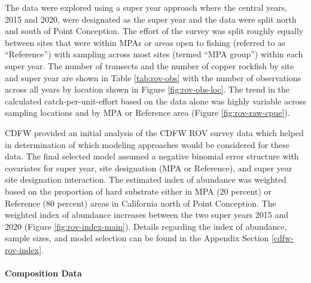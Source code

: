 \documentclass[11pt,
  english,
  letterpaper,
]{article}
\begin{document}
The data were explored using a super year approach where the central years, 2015 and 2020, were designated as the super year and the data were split north and south of Point Conception. The effort of the survey was split roughly equally between sites that were within MPAs or areas open to fishing (referred to as ``Reference'') with sampling across most sites (termed ``MPA group'') within each super year. The number of transects and the number of copper rockfish by site and super year are shown in Table \ref{tab:rov-obs} with the number of observations across all years by location shown in Figure \ref{fig:rov-obs-loc}. The trend in the calculated catch-per-unit-effort based on the data alone was highly variable across sampling locations and by MPA or Reference area (Figure \ref{fig:rov-raw-cpue}).

CDFW provided an initial analysis of the CDFW ROV survey data which helped in determination of which modeling approaches would be considered for these data. The final selected model assumed a negative binomial error structure with covariates for super year, site designation (MPA or Reference), and super year site designation interaction. The estimated index of abundance was weighted based on the proportion of hard substrate either in MPA (20 percent) or Reference (80 percent) areas in California north of Point Conception. The weighted index of abundance increases between the two super years 2015 and 2020 (Figure \ref{fig:rov-index-main}). Details regarding the index of abundance, sample sizes, and model selection can be found in the Appendix Section \ref{cdfw-rov-index}.

\hypertarget{composition-data-3}{%
\paragraph{Composition Data}\label{composition-data-3}}

\hfill\break
\end{document}
